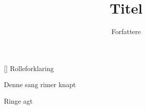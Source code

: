 \documentclass[a4paper,11pt]{article}
\title{Titel}
\author{Forfattere}
\begin{document}
\maketitle

\begin{roles}
[] Rolleforklaring
\end{roles}

\begin{song}
   Denne sang rimer knapt

   Ringe agt
\end{song}
\end{document}
